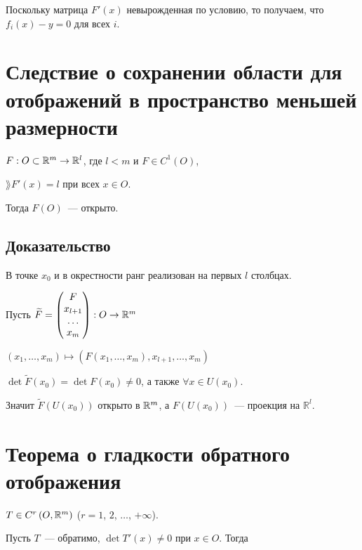 \documentclass{article}
\begin{document}
            Поскольку матрица $F'(x)$ невырожденная по условию, то получаем, что $f_i(x) - y = 0$ для всех $i$.
            
    \newpage
    
    \section{Следствие о сохранении области для отображений в пространство меньшей размерности}
    
        $F : O \subset \mathbb{R}^m \rightarrow \mathbb{R}^l$, где $l < m$ и $F \in C^1(O)$,
        
        $\rang F'(x) = l$ при всех $x \in O$.
        
        Тогда $F(O)$~--- открыто.
        
        \subsection{Доказательство}
        
            В точке $x_0$ и в окрестности ранг реализован на первых $l$ столбцах. 
            
            Пусть $\widetilde{F} = \begin{pmatrix} F \\ x_{l + 1} \\ \ldots \\ x_{m} \end{pmatrix} : O \rightarrow \mathbb{R}^m$
            
            $(x_1, \ldots, x_m) \mapsto \left( F(x_1, \ldots, x_m), x_{l + 1}, \ldots, x_m \right)$
            
            $\det \widetilde{F}(x_0) = \det F(x_0) \neq 0$, а также $\forall x \in U(x_0)$. 
            
            Значит $\widetilde{F}(U(x_0))$ открыто в $\mathbb{R}^m$, а $F(U(x_0))$~--- проекция на $\mathbb{R}^l$.
            
    \newpage
    
    \section{Теорема о гладкости обратного отображения}
    
        $T \in C^r \left( O, \mathbb{R}^m \right)$ ($r = 1$, $2$, $\ldots$, $+\infty$).
        
        Пусть $T$~--- обратимо, $\det T'(x) \neq 0$ при $x \in O$. Тогда
        
\end{document}

